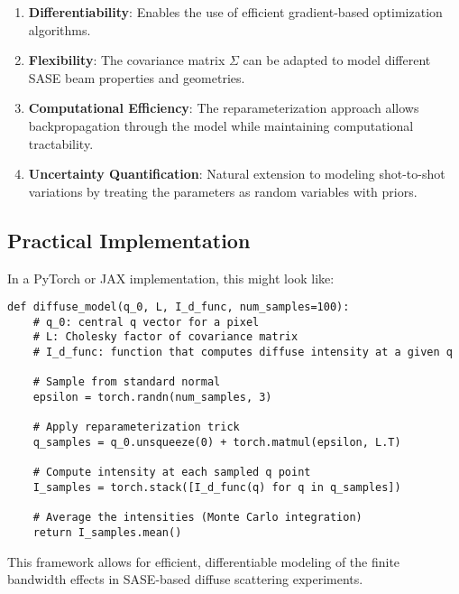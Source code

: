 \documentclass[12pt,a4paper]{article}
\begin{document}
\begin{enumerate}
\item \textbf{Differentiability}: Enables the use of efficient gradient-based optimization algorithms.

\item \textbf{Flexibility}: The covariance matrix $\Sigma$ can be adapted to model different SASE beam properties and geometries.

\item \textbf{Computational Efficiency}: The reparameterization approach allows backpropagation through the model while maintaining computational tractability.

\item \textbf{Uncertainty Quantification}: Natural extension to modeling shot-to-shot variations by treating the parameters as random variables with priors.
\end{enumerate}

\subsection{Practical Implementation}

In a PyTorch or JAX implementation, this might look like:

\begin{verbatim}
def diffuse_model(q_0, L, I_d_func, num_samples=100):
    # q_0: central q vector for a pixel
    # L: Cholesky factor of covariance matrix
    # I_d_func: function that computes diffuse intensity at a given q
    
    # Sample from standard normal
    epsilon = torch.randn(num_samples, 3)
    
    # Apply reparameterization trick
    q_samples = q_0.unsqueeze(0) + torch.matmul(epsilon, L.T)
    
    # Compute intensity at each sampled q point
    I_samples = torch.stack([I_d_func(q) for q in q_samples])
    
    # Average the intensities (Monte Carlo integration)
    return I_samples.mean()
\end{verbatim}

This framework allows for efficient, differentiable modeling of the finite bandwidth effects in SASE-based diffuse scattering experiments.
\end{document}
